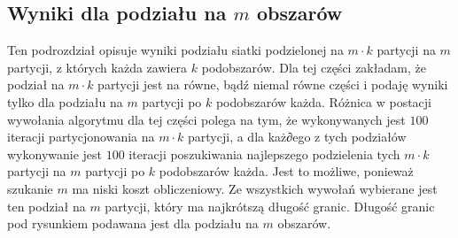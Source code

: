 \subsection{Wyniki dla podziału na $m$ obszarów}

Ten podrozdział opisuje wyniki podziału siatki podzielonej na $m \cdot k$ partycji na $m$ partycji, z których każda
zawiera $k$ podobszarów.
Dla tej części zakładam, że podział na $m \cdot k$ partycji jest na równe, bądź niemal równe części i podaję
wyniki tylko dla podziału na $m$ partycji po $k$ podobszarów każda.
Różnica w postacji wywołania algorytmu dla tej części polega na tym, że wykonywanych jest $100$ iteracji
partycjonowania na $m \cdot k$ partycji, a dla każ∂ego z tych podziałów wykonywanie jest $100$ iteracji poszukiwania
najlepszego podzielenia tych $m \cdot k$ partycji na $m$ partycji po $k$ podobszarów każda.
Jest to możliwe, ponieważ szukanie $m$ ma niski koszt obliczeniowy.
Ze wszystkich wywołań wybierane jest ten podział na $m$ partycji, który ma najkrótszą długość granic.
Długość granic pod rysunkiem podawana jest dla podziału na $m$ obszarów.

